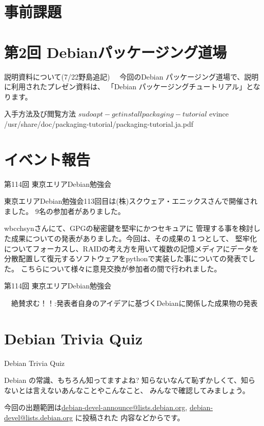 \section{事前課題}
{\footnotesize
 
}

\section{第2回 Debianパッケージング道場}

\begin{frame}[containsverbatim]{説明資料について(7/22野島追記)}
　今回のDebian パッケージング道場で、説明に利用されたプレゼン資料は、
「Debian パッケージングチュートリアル」となります。
\begin{commandlinesmall}
入手方法及び閲覧方法
$ sudo apt-get install packaging-tutorial
$ evince /usr/share/doc/packaging-tutorial/packaging-tutorial.ja.pdf
\end{commandlinesmall}
\end{frame}

\section{イベント報告}

\begin{frame}{第114回 東京エリアDebian勉強会}

 東京エリアDebian勉強会113回目は(株)スクウェア・エニックスさんで開催されました。
9名の参加者がありました。

 wbcchsynさんにて、GPGの秘密鍵を堅牢にかつセキュアに
管理する事を検討した成果についての発表がありました。今回は、その成果の１つとして、
堅牢化についてフォーカスし、RAIDの考え方を用いて複数の記憶メディアにデータを
分散配置して復元するソフトウェアをpythonで実装した事についての発表でした。
こちらについて様々に意見交換が参加者の間で行われました。

\end{frame}

\begin{frame}{第114回 東京エリアDebian勉強会}

　絶賛求む！！:発表者自身のアイデアに基づくDebianに関係した成果物の発表

\end{frame}


\section{Debian Trivia Quiz}
\begin{frame}{Debian Trivia Quiz}

  Debian の常識、もちろん知ってますよね?
知らないなんて恥ずかしくて、知らないとは言えないあんなことやこんなこと、
みんなで確認してみましょう。

今回の出題範囲は\url{debian-devel-announce@lists.debian.org},
\url{debian-devel@lists.debian.org} に投稿された
内容などからです。

\end{frame}

